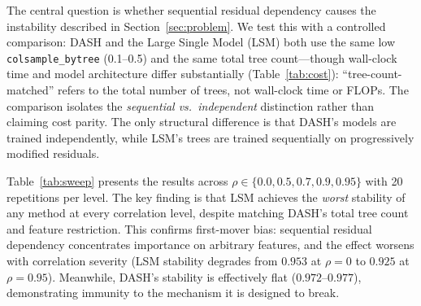 \documentclass[11pt]{article}
\newcommand{\dash}{\textsc{DASH}}
\newcommand{\rhovar}{\rho}
\begin{document}
The central question is whether sequential residual dependency causes
the instability described in Section~\ref{sec:problem}. We test this
with a controlled comparison: \dash{} and the Large Single Model (LSM)
both use the same low \texttt{colsample\_bytree} (0.1--0.5) and the same
total tree count---though wall-clock time and model architecture differ
substantially (Table~\ref{tab:cost}): ``tree-count-matched'' refers to
the total number of trees, not wall-clock time or FLOPs. The comparison isolates the
\emph{sequential vs.\ independent} distinction rather than claiming
cost parity. The only structural difference is that \dash{}'s models
are trained independently, while LSM's trees are trained sequentially
on progressively modified residuals.

Table~\ref{tab:sweep} presents the results across
$\rhovar \in \{0.0, 0.5, 0.7, 0.9, 0.95\}$ with 20 repetitions per
level. The key finding is that LSM achieves the \emph{worst}
stability of any method at every correlation level, despite matching
\dash{}'s total tree count and feature restriction. This confirms
first-mover bias: sequential residual dependency concentrates
importance on arbitrary features, and the effect worsens with
correlation severity (LSM stability degrades from $0.953$ at
$\rhovar = 0$ to $0.925$ at $\rhovar = 0.95$). Meanwhile, \dash{}'s
stability is effectively flat ($0.972$--$0.977$), demonstrating
immunity to the mechanism it is designed to break.
\end{document}
